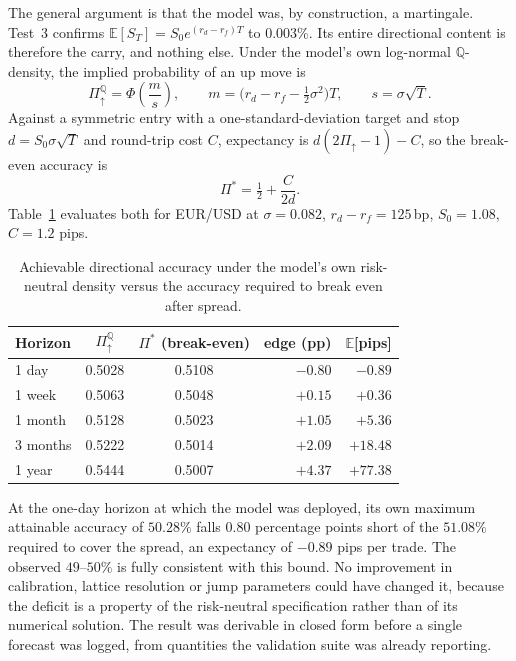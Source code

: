 \documentclass[11pt]{article}
\begin{document}
The general argument is that the model was, by construction, a martingale.
Test~3 confirms $\mathbb{E}[S_T] = S_0 e^{(r_d - r_f)T}$ to $0.003\%$. Its
entire directional content is therefore the carry, and nothing else. Under
the model's own log-normal $\mathbb{Q}$-density, the implied probability of
an up move is
\begin{equation}
\Pi_\uparrow^{\mathbb{Q}} = \Phi\!\left(\frac{m}{s}\right),
\qquad
m = \big(r_d - r_f - \tfrac{1}{2}\sigma^2\big)T,
\qquad
s = \sigma\sqrt{T}.
\end{equation}
Against a symmetric entry with a one-standard-deviation target and stop
$d = S_0\sigma\sqrt{T}$ and round-trip cost $C$, expectancy is
$d(2\Pi_\uparrow - 1) - C$, so the break-even accuracy is
\begin{equation}
\Pi^{*} = \tfrac{1}{2} + \frac{C}{2d}.
\end{equation}
Table~\ref{tab:horizon} evaluates both for EUR/USD at $\sigma = 0.082$,
$r_d - r_f = 125$\,bp, $S_0 = 1.08$, $C = 1.2$ pips.

\begin{table}[ht]
\centering\small
\begin{tabular}{lccrr}
\toprule
Horizon & $\Pi_\uparrow^{\mathbb{Q}}$ & $\Pi^{*}$ (break-even)
  & edge (pp) & $\mathbb{E}$[pips] \\
\midrule
1 day    & 0.5028 & 0.5108 & $-0.80$ & $-0.89$ \\
1 week   & 0.5063 & 0.5048 & $+0.15$ & $+0.36$ \\
1 month  & 0.5128 & 0.5023 & $+1.05$ & $+5.36$ \\
3 months & 0.5222 & 0.5014 & $+2.09$ & $+18.48$ \\
1 year   & 0.5444 & 0.5007 & $+4.37$ & $+77.38$ \\
\bottomrule
\end{tabular}
\caption{Achievable directional accuracy under the model's own risk-neutral
density versus the accuracy required to break even after spread.}
\label{tab:horizon}
\end{table}

At the one-day horizon at which the model was deployed, its own maximum
attainable accuracy of $50.28\%$ falls $0.80$ percentage points short of the
$51.08\%$ required to cover the spread, an expectancy of $-0.89$ pips per
trade. The observed $49$--$50\%$ is fully consistent with this bound. No
improvement in calibration, lattice resolution or jump parameters could have
changed it, because the deficit is a property of the risk-neutral
specification rather than of its numerical solution. The result was
derivable in closed form before a single forecast was logged, from
quantities the validation suite was already reporting.
\end{document}
